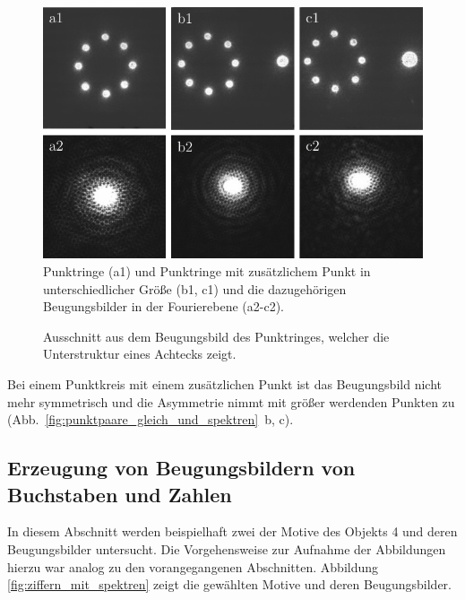 \begin{figure}[h]
	\centering
	\includegraphics{images/Regina/abb17.pdf}
	\caption[Punktringe mit Fourierspektren]{
		Punktringe (a1) und Punktringe mit zusätzlichem Punkt in unterschiedlicher Größe (b1, c1) und die dazugehörigen Beugungsbilder in der Fourierebene (a2-c2).
	}
	\label{fig:punktringe_und_spektrum}
\end{figure}

\begin{figure}[h]
	\centering
	\caption[Beugungsbild der Punktringe mit Unterstruktur]{
		Ausschnitt aus dem Beugungsbild des Punktringes, welcher die Unterstruktur eines Achtecks zeigt.
	}
	\label{fig:punktringe_ausschnitt}
\end{figure}

Bei einem Punktkreis mit einem zusätzlichen Punkt ist das Beugungsbild nicht mehr symmetrisch und die Asymmetrie nimmt mit größer werdenden Punkten zu (Abb.~\ref{fig:punktpaare_gleich_und_spektren}~b, c).


\subsection{Erzeugung von Beugungsbildern von Buchstaben und Zahlen}

In diesem Abschnitt werden beispielhaft zwei der Motive des Objekts 4 und deren Beugungsbilder untersucht. Die Vorgehensweise zur Aufnahme der Abbildungen hierzu war analog zu den vorangegangenen Abschnitten. Abbildung \ref{fig:ziffern_mit_spektren} zeigt die gewählten Motive und deren Beugungsbilder. 

